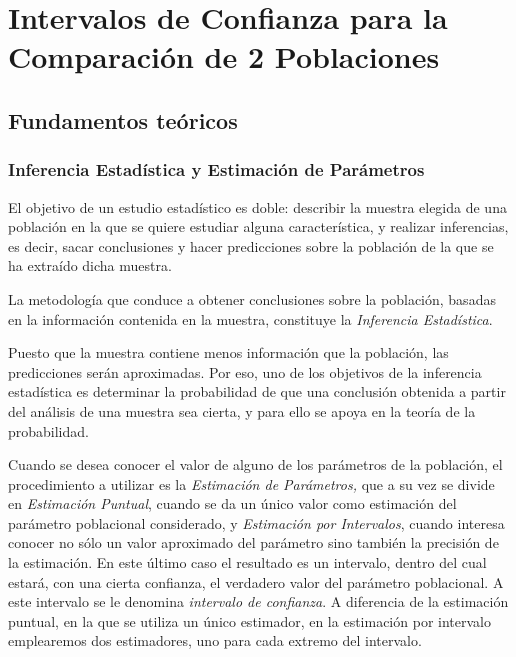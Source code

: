 
\chapter[Intervalos de Confianza para la Comparación de 2 Poblaciones]{Intervalos de Confianza para la \\ Comparación de 2 Poblaciones}

\section{Fundamentos teóricos}

\subsection{Inferencia Estadística y Estimación de Parámetros}
El objetivo de un estudio estadístico es doble: describir la muestra elegida de una población en la que se quiere
estudiar alguna característica, y realizar inferencias, es decir, sacar conclusiones y hacer predicciones sobre la
población de la que se ha extraído dicha muestra.

La metodología que conduce a obtener conclusiones sobre la población, basadas en la información contenida en la muestra,
constituye la \emph{Inferencia Estadística}.

Puesto que la muestra contiene menos información que la población, las predicciones serán aproximadas. Por eso, uno de
los objetivos de la inferencia estadística es determinar la probabilidad de que una conclusión obtenida a partir del
análisis de una muestra sea cierta, y para ello se apoya en la teoría de la probabilidad.

Cuando se desea conocer el valor de alguno de los parámetros de la población, el procedimiento a utilizar es la
\emph{Estimación de Parámetros, }que a su vez se divide en \emph{Estimación Puntual}, cuando se da un único valor como
estimación del parámetro poblacional considerado, y \emph{Estimación por Intervalos}, cuando interesa conocer no sólo un
valor aproximado del parámetro sino también la precisión de la estimación. En este último caso el resultado es un
intervalo, dentro del cual estará, con una cierta confianza, el verdadero valor del parámetro poblacional. A este
intervalo se le denomina \emph{intervalo de confianza}. A diferencia de la estimación puntual, en la que se utiliza un
único estimador, en la estimación por intervalo emplearemos dos estimadores, uno para cada extremo del intervalo.

